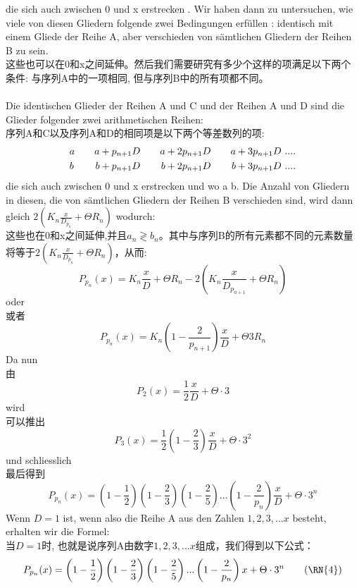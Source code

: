 \documentclass[UTF8,a4paper,zihao=-4]{article}
\begin{document}
die sich auch zwischen 0 und x erstrecken . Wir haben dann zu untersuchen, wie viele von diesen Gliedern folgende zwei Bedingungen erfüllen : identisch mit einem Gliede der Reihe A, aber verschieden von sämtlichen Gliedern der Reihen B zu sein.\\
这些也可以在0和x之间延伸。然后我们需要研究有多少个这样的项满足以下两个条件: 与序列A中的一项相同, 但与序列B中的所有项都不同。\\\\
\indent Die identischen Glieder der Reihen A und C und der Reihen A und D sind die Glieder folgender zwei arithmetischen Reihen:\\
\indent 序列A和C以及序列A和D的相同项是以下两个等差数列的项:
\begin{align*}
&a\hspace{2em}a+p_{n+1}D\hspace{2em}a+2p_{n+1}D\hspace{2em}a+3p_{n+1}D\ ....\\
&b\hspace{2.2em}b+p_{n+1}D\hspace{2.1em}b+2p_{n+1}D\hspace{2.1em}b+3p_{n+1}D\ ....
\end{align*}
die sich auch zwischen 0 und x erstrecken und wo a b. Die Anzahl von Gliedern in diesen, die von sämtlichen Gliedern der Reihen B verschieden sind, wird dann gleich $2\left(K_n\frac{x}{D_{p_n}}+\Theta R_n\right)$ wodurch:\\
这些也在0和x之间延伸,并且$a_n\gtrless b_n$。其中与序列B的所有元素都不同的元素数量将等于$2\left(K_n\frac{x}{D_{p_n}}+\Theta R_n\right)$，从而:
$$
P_{p_n}(x)=K_n\frac{x}{D}+\Theta R_n-2\left(K_n\frac{x}{D_{p_{n+1}}}+\Theta R_n\right)
$$
oder\\
或者
$$
P_{p_n}(x)=K_n(1-\frac{2}{p_{n+1}})\frac{x}{D}+\Theta 3R_n
$$
Da nun\\
由
$$
P_2(x)=\frac{1}{2}\frac{x}{D}+\Theta\cdot3
$$
wird\\
可以推出
$$
P_3(x)=\frac{1}{2}\left(1-\frac{2}{3}\right)\frac{x}{D}+\Theta\cdot3^2
$$
und schliesslich\\
最后得到
$$
P_{p_n}(x)=\left(1-\frac{1}{2}\right)\left(1-\frac{2}{3}\right)\left(1-\frac{2}{5}\right)...\left(1-\frac{2}{p_n}\right)\frac{x}{D}+\Theta\cdot3^n
$$
\indent Wenn $D=1$ ist, wenn also die Reihe A aus den Zahlen $1 ,2,3,... x$ besteht, erhalten wir die Formel:\\
\indent 当$D=1$时, 也就是说序列A由数字$1,2,3,...x$组成，我们得到以下公式：
\begin{align}
P_{p_n}(x)=\left(1-\frac{1}{2}\right)\left(1-\frac{2}{3}\right)\left(1-\frac{2}{5}\right)...\left(1-\frac{2}{p_n}\right)x+\Theta\cdot3^n\tag{\RN{4}}
\end{align}
\end{document}
